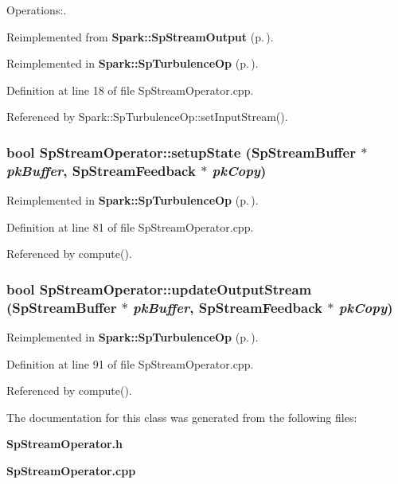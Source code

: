 Operations:. 



Reimplemented from {\bf Spark::Sp\-Stream\-Output} {\rm (p.\,\pageref{classSpark_1_1SpStreamOutput_a2})}.



Reimplemented in {\bf Spark::Sp\-Turbulence\-Op} {\rm (p.\,\pageref{classSpark_1_1SpTurbulenceOp_a4})}.

Definition at line 18 of file Sp\-Stream\-Operator.cpp.

Referenced by Spark::Sp\-Turbulence\-Op::set\-Input\-Stream().
\subsubsection{\setlength{\rightskip}{0pt plus 5cm}bool Sp\-Stream\-Operator::setup\-State ({\bf Sp\-Stream\-Buffer} $\ast$ {\em pk\-Buffer}, {\bf Sp\-Stream\-Feedback} $\ast$ {\em pk\-Copy})\hspace{0.3cm}{\tt  [protected, virtual]}}\label{classSpark_1_1SpStreamOperator_b2}




Reimplemented in {\bf Spark::Sp\-Turbulence\-Op} {\rm (p.\,\pageref{classSpark_1_1SpTurbulenceOp_b1})}.

Definition at line 81 of file Sp\-Stream\-Operator.cpp.

Referenced by compute().
\subsubsection{\setlength{\rightskip}{0pt plus 5cm}bool Sp\-Stream\-Operator::update\-Output\-Stream ({\bf Sp\-Stream\-Buffer} $\ast$ {\em pk\-Buffer}, {\bf Sp\-Stream\-Feedback} $\ast$ {\em pk\-Copy})\hspace{0.3cm}{\tt  [protected, virtual]}}\label{classSpark_1_1SpStreamOperator_b4}




Reimplemented in {\bf Spark::Sp\-Turbulence\-Op} {\rm (p.\,\pageref{classSpark_1_1SpTurbulenceOp_b3})}.

Definition at line 91 of file Sp\-Stream\-Operator.cpp.

Referenced by compute().

The documentation for this class was generated from the following files:\begin{CompactItemize}
\item 
{\bf Sp\-Stream\-Operator.h}\item 
{\bf Sp\-Stream\-Operator.cpp}\end{CompactItemize}
